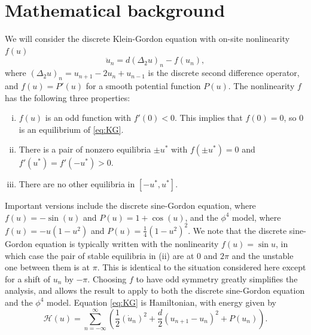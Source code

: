\documentclass[12pt,reqno]{amsart}
\begin{document}
\section{Mathematical background}\label{sec:bg}

We will consider the discrete Klein-Gordon equation with on-site nonlinearity $f(u)$
\begin{equation}\label{eq:KG}
\ddot{u}_n = d (\Delta_2 u)_n - f(u_n),
\end{equation}
where $(\Delta_2 u)_n = u_{n+1} - 2 u_n + u_{n-1}$ is the discrete second difference operator, and $f(u) = P'(u)$ for a smooth potential function $P(u)$. The nonlinearity $f$ has the following three properties:
\begin{enumerate}[(i)]
	\item {$f(u)$ is an odd function with $f'(0) < 0$. This implies that $f(0) = 0$, so 0 is an equilibrium of \cref{eq:KG}.}
	\item There is a pair of nonzero equilibria $\pm u^*$ with $f(\pm u^*) = 0$ and $f'(u^*) = f'(-u^*) > 0$.
	\item There are no other equilibria in $[-u^*, u^*]$.
\end{enumerate}
Important versions include the discrete sine-Gordon equation, where $f(u) = -\sin(u)$ and $P(u) = 1 + \cos(u)$, and the $\phi^4$ model, where $f(u) = -u(1-u^2)$ and $P(u) = \frac{1}{4}(1-u^2)^2$.
We note that the discrete sine-Gordon equation is typically written with the nonlinearity $f(u) = \sin u$, in which case the pair of stable
equilibria in (ii) are at 0 and $2 \pi$ and the unstable one between them
is at $\pi$. This is identical to the situation considered here except for a shift of $u_n$ by $-\pi$. Choosing $f$ to have odd symmetry greatly simplifies the analysis, and allows the result to apply to both the discrete sine-Gordon equation and the $\phi^4$ model.
Equation \cref{eq:KG} is Hamiltonian, with energy given by \cite{KevrekidisWeinstein2000}
\begin{equation}\label{eq:H}
	\mathcal{H}(u) = \sum_{n=-\infty}^\infty 
	\left( \frac{1}{2} (\dot{u}_n)^2 + \frac{d}{2} (u_{n+1} - u_n)^2 + P(u_n) \right).
\end{equation}
\end{document}
